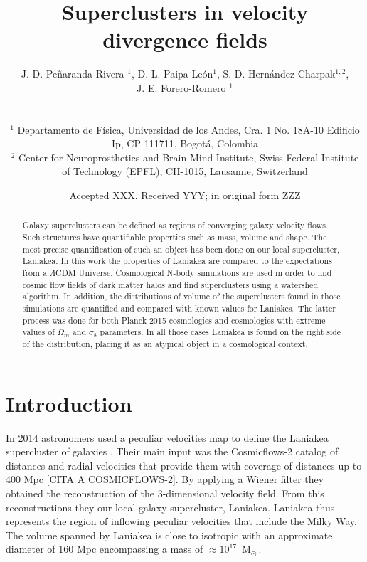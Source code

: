 \documentclass[usenatbib]{mnras}
\title[Superclusters in velocity divergence fields]{Superclusters in velocity divergence fields}
\author[Pe\~naranda-Rivera et al.]{
\parbox[t]{\textwidth}{
    {J. D. Pe\~naranda-Rivera $^1$,} 
    {D. L. Paipa-Le\'on$^{1}$,}
    {S. D. Hern\'andez-Charpak$^{1,2}$,}\\
    {J. E. Forero-Romero $^{1}$}
}
\\\\
$^{1}$ Departamento de F\'isica, Universidad de los Andes, Cra. 1
  No. 18A-10 Edificio Ip, CP 111711, Bogot\'a, Colombia \\
$^{2}$ Center for Neuroprosthetics and Brain Mind Institute, Swiss
  Federal Institute of Technology (EPFL), CH-1015, Lausanne,
  Switzerland\\  
}
\date{Accepted XXX. Received YYY; in original form ZZZ}
\newcommand{\Msun}{\,{\rm M}$_{\odot}$\,}
\begin{document}
\label{firstpage}
\pagerange{\pageref{firstpage}--\pageref{lastpage}}
\maketitle

\maketitle
\begin{abstract}
Galaxy superclusters can be defined as regions of converging galaxy
velocity flows. Such structures have quantifiable properties such as
mass, volume and shape. The most precise quantification of such an
object has been done on our local supercluster, Laniakea. In this work
the properties of Laniakea are compared to the expectations from a
$\Lambda$CDM Universe. Cosmological N-body simulations are used in
order to find cosmic flow fields of dark matter halos and find
superclusters using a watershed algorithm. In addition, the
distributions of volume of the superclusters found in those
simulations are quantified and compared with known values for
Laniakea. The latter process was done for both Planck 2015 cosmologies
and cosmologies with extreme values of $\Omega_m$ and $\sigma_8$
parameters. In all those cases Laniakea is found on the right side of
the distribution, placing it as an atypical object in a cosmological
context.  
\end{abstract}

\begin{keywords}
\end{keywords}




\section{Introduction}


In 2014 astronomers used a peculiar velocities map  to 
define the Laniakea supercluster of galaxies
\citep{2014Natur.513...71T}.  
Their main input was the Cosmicflows-2 catalog of distances and radial
velocities that provide them with coverage of distances up to 400 Mpc
[CITA A COSMICFLOWS-2]. 
By applying a Wiener filter \citep{Zaroubi_1999} they obtained the
reconstruction of the 3-dimensional velocity field. 
From this reconstructions they our local galaxy supercluster, Laniakea.
Laniakea thus represents the region of inflowing peculiar velocities
that include the Milky Way. 
The volume spanned by Laniakea is close to isotropic with an 
approximate diameter of $160$ Mpc encompassing a mass of
$\approx 10^{17}$ \Msun.
\end{document}
